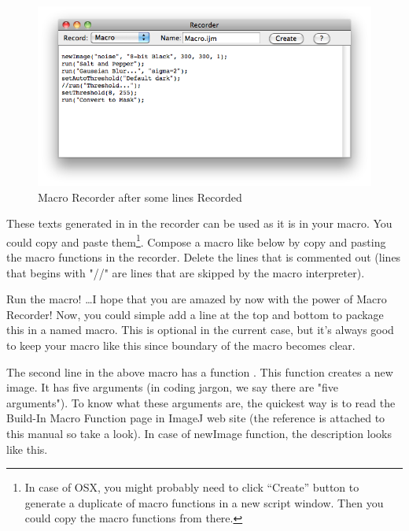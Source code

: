 \begin{figure}[htbp]
\begin{center}
\includegraphics[scale=0.6]{fig/MacroRecorderFilled.png}
\caption{Macro Recorder after some lines Recorded} 
\label{fig_macroRecorderFilled}
\end{center}
\end{figure}

These texts generated in in the recorder can be used as it is in your macro.  You could copy and paste them\footnote{In case of OSX, you might probably need to click ``Create'' button to generate a duplicate of macro functions in a new script window. Then you could copy the macro functions from there.}. Compose a macro like below by copy and pasting the macro functions in the recorder.  Delete the lines that is commented out (lines that begins with "//" are lines that are skipped by the macro interpreter).


Run the macro! \ldots I hope that you are amazed by now with the power of Macro
Recorder! Now, you could simple add a line at the top and bottom to package this in a named macro. This is optional in the current case, but it's always good to keep your macro like this since boundary of the macro becomes clear. 
 


The second line in the above macro has a function . This
function creates a new image. It has five arguments (in coding jargon, we say
there are "five arguments"). To know what these arguments are, 
the quickest way is to read the Build-In Macro Function page in ImageJ web site  
(the reference is attached to this manual so take a look).  
In case of newImage function, the description looks like this. 

